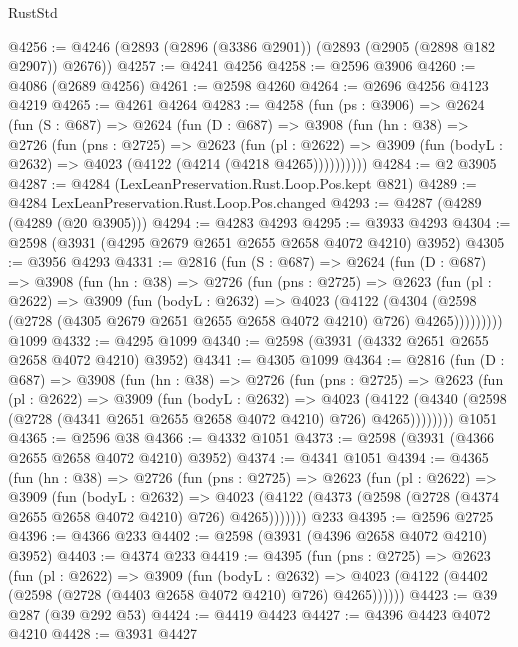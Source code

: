 \begin{lexlean}{RustStd}
\begin{coremodule}
@4256 := @4246 (@2893 (@2896 (@3386 @2901)) (@2893 (@2905 (@2898 @182 @2907)) @2676))
@4257 := @4241 @4256
@4258 := @2596 @3906
@4260 := @4086 (@2689 @4256)
@4261 := @2598 @4260
@4264 := @2696 @4256 @4123 @4219
@4265 := @4261 @4264
@4283 := @4258
    (fun (ps : @3906) =>
    @2624
      (fun (S : @687) =>
      @2624
        (fun (D : @687) =>
        @3908
          (fun (hn : @38) =>
          @2726
            (fun (pns : @2725) =>
            @2623
              (fun (pl : @2622) =>
              @3909 (fun (bodyL : @2632) => @4023 (@4122 (@4214 (@4218 @4265))))))))))
@4284 := @2 @3905
@4287 := @4284 (LexLeanPreservation.Rust.Loop.Pos.kept @821)
@4289 := @4284 LexLeanPreservation.Rust.Loop.Pos.changed
@4293 := @4287 (@4289 (@4289 (@20 @3905)))
@4294 := @4283 @4293
@4295 := @3933 @4293
@4304 := @2598 (@3931 (@4295 @2679 @2651 @2655 @2658 @4072 @4210) @3952)
@4305 := @3956 @4293
@4331 := @2816
    (fun (S : @687) =>
    @2624
      (fun (D : @687) =>
      @3908
        (fun (hn : @38) =>
        @2726
          (fun (pns : @2725) =>
          @2623
            (fun (pl : @2622) =>
            @3909
              (fun (bodyL : @2632) =>
              @4023
                (@4122
                  (@4304
                    (@2598 (@2728 (@4305 @2679 @2651 @2655 @2658 @4072 @4210) @726) @4265)))))))))
    @1099
@4332 := @4295 @1099
@4340 := @2598 (@3931 (@4332 @2651 @2655 @2658 @4072 @4210) @3952)
@4341 := @4305 @1099
@4364 := @2816
    (fun (D : @687) =>
    @3908
      (fun (hn : @38) =>
      @2726
        (fun (pns : @2725) =>
        @2623
          (fun (pl : @2622) =>
          @3909
            (fun (bodyL : @2632) =>
            @4023
              (@4122 (@4340 (@2598 (@2728 (@4341 @2651 @2655 @2658 @4072 @4210) @726) @4265))))))))
    @1051
@4365 := @2596 @38
@4366 := @4332 @1051
@4373 := @2598 (@3931 (@4366 @2655 @2658 @4072 @4210) @3952)
@4374 := @4341 @1051
@4394 := @4365
    (fun (hn : @38) =>
    @2726
      (fun (pns : @2725) =>
      @2623
        (fun (pl : @2622) =>
        @3909
          (fun (bodyL : @2632) =>
          @4023 (@4122 (@4373 (@2598 (@2728 (@4374 @2655 @2658 @4072 @4210) @726) @4265)))))))
    @233
@4395 := @2596 @2725
@4396 := @4366 @233
@4402 := @2598 (@3931 (@4396 @2658 @4072 @4210) @3952)
@4403 := @4374 @233
@4419 := @4395
    (fun (pns : @2725) =>
    @2623
      (fun (pl : @2622) =>
      @3909
        (fun (bodyL : @2632) =>
        @4023 (@4122 (@4402 (@2598 (@2728 (@4403 @2658 @4072 @4210) @726) @4265))))))
@4423 := @39 @287 (@39 @292 @53)
@4424 := @4419 @4423
@4427 := @4396 @4423 @4072 @4210
@4428 := @3931 @4427

\end{coremodule}
\end{lexlean}
